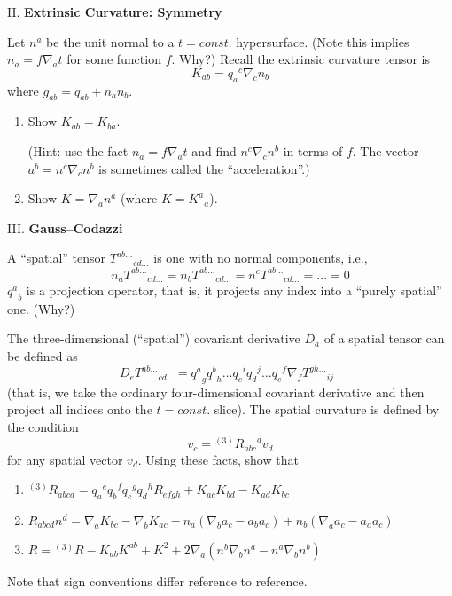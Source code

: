 \medbreak\noindent{}II. \textbf{Extrinsic Curvature: Symmetry}\medbreak

Let $n^{a}$ be the unit normal to a $t=const.$ hypersurface. (Note this
implies $n_{a}=f\nabla_{a}t$ for some function $f$. Why?) Recall the
extrinsic curvature tensor is
\begin{equation}
K_{ab} = {q_{a}}^{c}\nabla_{c}n_{b}
\end{equation}
where $g_{ab}=q_{ab}+n_{a}n_{b}$.

\begin{enumerate}[label=(\alph*),nosep]
\item Show $K_{ab}=K_{ba}$.

  (Hint: use the fact $n_{a}=f\nabla_{a}t$ and find
  $n^{c}\nabla_{c}n^{b}$ in terms of $f$. The vector
  $a^{b}=n^{c}\nabla_{c}n^{b}$ is sometimes called the ``acceleration''.)
\item Show $K=\nabla_{a}n^{a}$ (where $K={K^{a}}_{a}$).
\end{enumerate}

\medbreak\noindent{}III. \textbf{Gauss--Codazzi}\medbreak

A ``spatial'' tensor ${T^{ab\dots}}_{cd\dots}$ is one with no normal
components, i.e.,
\begin{equation*}
n_{a}{T^{ab\dots}}_{cd\dots} = n_{b}{T^{ab\dots}}_{cd\dots} =
n^{c}{T^{ab\dots}}_{cd\dots} = \dots = 0
\end{equation*}
${q^{a}}_{b}$ is a projection operator, that is, it projects any index
into a ``purely spatial'' one. (Why?)

The three-dimensional (``spatial'') covariant derivative $D_{a}$ of a
spatial tensor can be defined as
\begin{equation*}
D_{e}{T^{ab\dots}}_{cd\dots} = {q^{a}}_{g}{q^{b}}_{h}\dots{q_{c}}^{i}{q_{d}}^{j}\dots{q_{e}}^{f}\nabla_{f}{T^{gh\dots}}_{ij\dots}
\end{equation*}
(that is, we take the ordinary four-dimensional covariant derivative and
then project all indices onto the $t=const.$ slice). The spatial
curvature is defined by the condition
\begin{equation*}
[D_{a},D_{b}]v_{c}={}^{(3)}\!{R_{abc}}^{d}v_{d}
\end{equation*}
for any spatial vector $v_{d}$. Using these facts, show that
\begin{enumerate}[label=(\alph*),nosep]
\item ${}^{(3)}\!{R_{abcd}} = {q_{a}}^{e}{q_{b}}^{f}{q_{c}}^{g}{q_{d}}^{h}R_{efgh}+K_{ac}K_{bd}-K_{ad}K_{bc}$
\item $R_{abcd}n^{d}=\nabla_{a}K_{bc} - \nabla_{b}K_{ac} - n_{a}(\nabla_{b}a_{c}-a_{b}a_{c}) + n_{b}(\nabla_{a}a_{c}-a_{a}a_{c})$
\item $R = {}^{(3)}\!R - K_{ab}K^{ab} + K^{2} + 2\nabla_{a}(n^{b}\nabla_{b}n^{a} - n^{a}\nabla_{b}n^{b})$
\end{enumerate}
Note that sign conventions differ reference to reference.

